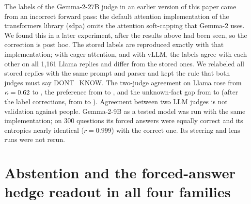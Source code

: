 \documentclass{article}
\begin{document}
The labels of the Gemma-2-27B judge in an earlier version of this paper came from an incorrect forward pass: the default attention implementation of the transformers library (sdpa) omits the attention soft-capping that Gemma-2 uses. We found this in a later experiment, after the results above had been seen, so the correction is post hoc. The stored labels are reproduced exactly with that implementation; with eager attention, and with vLLM, the labels agree with each other on all 1{,}161 Llama replies and differ from the stored ones. We relabeled all \cRejudged{} stored replies with the same prompt and parser and kept the rule that both judges must say DONT\_KNOW. The two-judge agreement on Llama rose from $\kappa=0.62$ to \hmLlamaKappa{}, the preference from \asPrintedMargin{} \asPrintedMarginCI{} to \hmLlamaDiff{} \hmLlamaDiffCI, and the unknown-fact gap from \asPrintedUnk{} \asPrintedUnkCI{} to \rcUnk{} \rcUnkCI{} (after the label corrections, from \asPrintedUnkJoint{} \asPrintedUnkJointCI{} to \rcUnkJoint{} \rcUnkJointCI). Agreement between two LLM judges is not validation against people. Gemma-2-9B as a tested model was run with the same implementation; on 300 questions its forced answers were equally correct and its entropies nearly identical ($r=0.999$) with the correct one. Its steering and lens runs were not rerun.

\section{Abstention and the forced-answer hedge readout in all four families}
\label{app:families}
\end{document}
